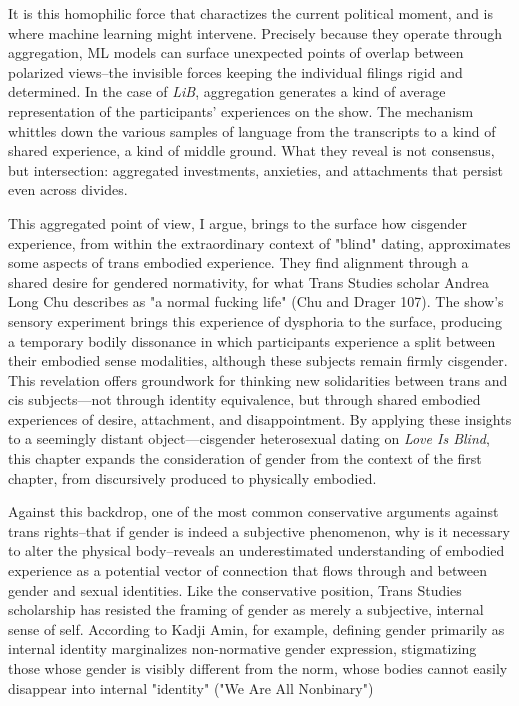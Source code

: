 \documentclass[11pt]{article}
\begin{document}
It is this homophilic force that charactizes the current political
moment, and is where machine learning might intervene. Precisely
because they operate through aggregation, ML models can surface
unexpected points of overlap between polarized views--the invisible
forces keeping the individual filings rigid and determined. In the
case of \emph{LiB}, aggregation generates a kind of average representation
of the participants' experiences on the show. The mechanism whittles
down the various samples of language from the transcripts to a kind of
shared experience, a kind of middle ground. What they reveal is not
consensus, but intersection: aggregated investments, anxieties, and
attachments that persist even across divides.

This aggregated point of view, I argue, brings to the surface how
cisgender experience, from within the extraordinary context of "blind"
dating, approximates some aspects of trans embodied experience. They
find alignment through a shared desire for gendered normativity, for
what Trans Studies scholar Andrea Long Chu describes as "a normal
fucking life" (Chu and Drager 107). The show's sensory experiment
brings this experience of dysphoria to the surface, producing a
temporary bodily dissonance in which participants experience a split
between their embodied sense modalities, although these subjects
remain firmly cisgender. This revelation offers groundwork for
thinking new solidarities between trans and cis subjects---not through
identity equivalence, but through shared embodied experiences of
desire, attachment, and disappointment. By applying these insights to
a seemingly distant object---cisgender heterosexual dating on \emph{Love Is
Blind}, this chapter expands the consideration of gender from the
context of the first chapter, from discursively produced to physically
embodied.

Against this backdrop, one of the most common conservative arguments
against trans rights--that if gender is indeed a subjective
phenomenon, why is it necessary to alter the physical body--reveals an
underestimated understanding of embodied experience as a potential
vector of connection that flows through and between gender and sexual
identities. Like the conservative position, Trans Studies scholarship
has resisted the framing of gender as merely a subjective, internal
sense of self. According to Kadji Amin, for example, defining gender
primarily as internal identity marginalizes non-normative gender
expression, stigmatizing those whose gender is visibly different from
the norm, whose bodies cannot easily disappear into internal
"identity" ("We Are All Nonbinary")
\end{document}
